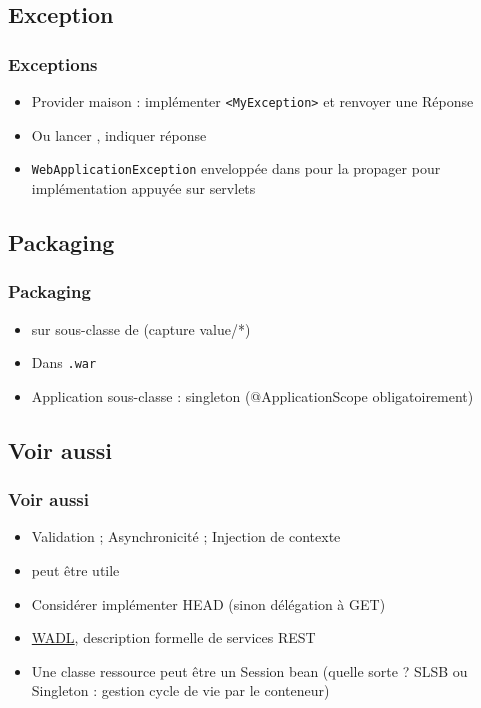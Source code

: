 \documentclass[english, french]{beamer}
\begin{document}
\subsection{Exception}
\begin{frame}
	\frametitle{Exceptions}
	\begin{itemize}
		\item Provider maison : implémenter \texttt{<MyException>} et renvoyer une Réponse
		\item Ou lancer , indiquer réponse
		\item \texttt{WebApplicationException} enveloppée dans  pour la propager {\tiny pour implémentation appuyée sur servlets}
	\end{itemize}
\end{frame}

\subsection{Packaging}
\begin{frame}
	\frametitle{Packaging}
	\begin{itemize}
		\item {} sur sous-classe de  (capture value/*)
		\item Dans \texttt{.war}
		\item Application sous-classe : singleton {\tiny (@ApplicationScope obligatoirement)}
	\end{itemize}
\end{frame}

\subsection{Voir aussi}
\begin{frame}
	\frametitle{Voir aussi}
	\begin{itemize}
		\item Validation ; Asynchronicité ; Injection de contexte%
		\item {} peut être utile
		\item Considérer implémenter HEAD (sinon délégation à GET)
		\item \href{http://www.w3.org/Submission/wadl/}{WADL}, description formelle de services REST
		\item Une classe ressource peut être un Session bean (quelle sorte ? \pause SLSB ou Singleton : gestion cycle de vie par le conteneur)
	\end{itemize}
\end{frame}
\end{document}
